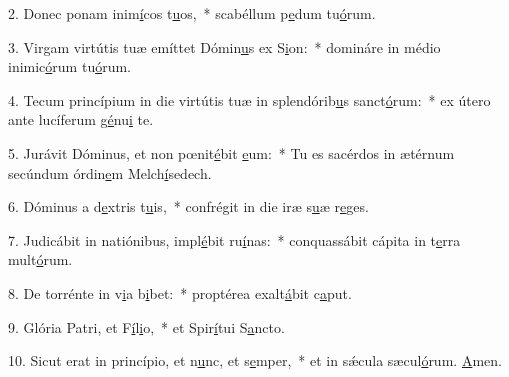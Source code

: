 2. Donec ponam inim\uline{í}cos t\uline{u}os,~* scabéllum p\uline{e}dum tu\uline{ó}rum.\par 
3. Virgam virtútis tuæ emíttet Dómin\uline{u}s ex S\uline{i}on:~* domináre in médio inimic\uline{ó}rum tu\uline{ó}rum.\par 
4. Tecum princípium in die virtútis tuæ in splendórib\uline{u}s sanct\uline{ó}rum:~* ex útero ante lucíferum g\uline{é}nu\uline{i} te.\par 
5. Jurávit Dóminus, et non pœnit\uline{é}bit \uline{e}um:~* Tu es sacérdos in ætérnum secúndum órdin\uline{e}m Melch\uline{í}sedech.\par 
6. Dóminus a d\uline{e}xtris t\uline{u}is,~* confrégit in die iræ s\uline{u}æ r\uline{e}ges.\par 
7. Judicábit in natiónibus, impl\uline{é}bit ru\uline{í}nas:~* conquassábit cápita in t\uline{e}rra mult\uline{ó}rum.\par 
8. De torrénte in v\uline{i}a b\uline{i}bet:~* proptérea exalt\uline{á}bit c\uline{a}put.\par 
9. Glória Patri, et F\uline{í}l\uline{i}o,~* et Spir\uline{í}tui S\uline{a}ncto.\par 
10. Sicut erat in princípio, et n\uline{u}nc, et s\uline{e}mper,~* et in sǽcula sæcul\uline{ó}rum. \uline{A}men.\par 

